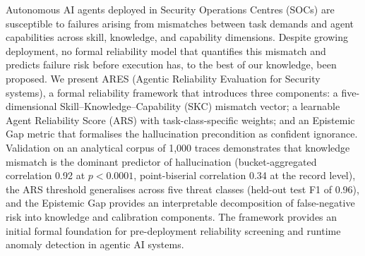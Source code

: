 Autonomous AI agents deployed in Security Operations Centres (SOCs) are
susceptible to failures arising from mismatches between task demands and
agent capabilities across skill, knowledge, and capability dimensions.
Despite growing deployment, no formal reliability model that quantifies
this mismatch and predicts failure risk before execution has, to the best
of our knowledge, been proposed. We present ARES (Agentic Reliability
Evaluation for Security systems), a formal reliability framework that
introduces three components: a five-dimensional
Skill--Knowledge--Capability (SKC) mismatch vector; a learnable Agent
Reliability Score (ARS) with task-class-specific weights; and an
Epistemic Gap metric that formalises the hallucination precondition as
confident ignorance. Validation on an analytical corpus of 1,000 traces
demonstrates that knowledge mismatch is the dominant predictor of
hallucination (bucket-aggregated correlation 0.92 at $p < 0.0001$,
point-biserial correlation 0.34 at the record level), the ARS threshold
generalises across five threat classes (held-out test F1 of 0.96), and
the Epistemic Gap provides an interpretable decomposition of
false-negative risk into knowledge and calibration components.
The framework provides an initial formal foundation for pre-deployment
reliability screening and runtime anomaly detection in agentic AI systems.
